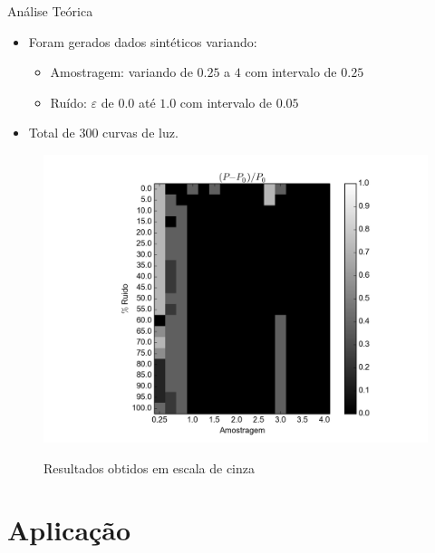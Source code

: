 \documentclass{beamer}
\begin{document}
\begin{frame}[allowframebreaks]{Análise Teórica}

\begin{itemize}
  \item Foram gerados dados sintéticos variando:
  \begin{itemize}
    \item Amostragem: variando de $0.25$ a $4$ com intervalo de $0.25$
    \item Ruído: $\varepsilon$ de $0.0$ até $1.0$ com intervalo de $0.05$
  \end{itemize}
  \item Total de $300$ curvas de luz.
\end{itemize}

\end{frame}

\begin{frame}%
 \begin{figure}
\centering
\hspace{-1.cm}\includegraphics[scale=.5]{ce_inshow.png}
\label{fig:imshow}
\caption{Resultados obtidos em escala de cinza}
\end{figure}
\end{frame}

\section{Aplicação}
\end{document}
